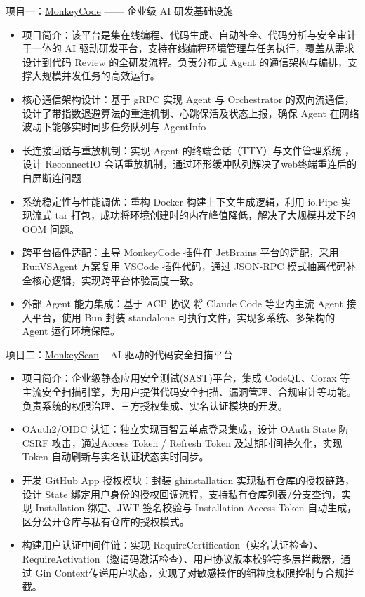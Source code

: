 \documentclass{resume}
\begin{document}
\begin{onehalfspacing}
项目一：\href{https://monkeycode-ai.com/}{MonkeyCode} —— 企业级 AI 研发基础设施
\begin{itemize}
  \item 项目简介：该平台是集在线编程、代码生成、自动补全、代码分析与安全审计于一体的 AI 驱动研发平台，支持在线编程环境管理与任务执行，覆盖从需求设计到代码 Review 的全研发流程。负责分布式 Agent 的通信架构与编排，支撑大规模并发任务的高效运行。
  \item 核心通信架构设计：基于 gRPC 实现 Agent 与 Orchestrator 的双向流通信，设计了带指数退避算法的重连机制、心跳保活及状态上报，确保 Agent 在网络波动下能够实时同步任务队列与 AgentInfo
  \item 长连接回话与重放机制：实现 Agent 的终端会话（TTY）与文件管理系统 ，设计 ReconnectIO 会话重放机制，通过环形缓冲队列解决了web终端重连后的白屏断连问题
  \item 系统稳定性与性能调优：重构 Docker 构建上下文生成逻辑，利用 io.Pipe 实现流式 tar 打包，成功将环境创建时的内存峰值降低，解决了大规模并发下的 OOM 问题。
  \item 跨平台插件适配：主导 MonkeyCode 插件在 JetBrains 平台的适配，采用 RunVSAgent 方案复用 VSCode 插件代码，通过 JSON-RPC 模式抽离代码补全核心逻辑，实现跨平台体验高度一致。
  \item 外部 Agent 能力集成：基于 ACP 协议 将 Claude Code 等业内主流 Agent 接入平台，使用 Bun 封装 standalone 可执行文件，实现多系统、多架构的 Agent 运行环境保障。
\end{itemize}
  

项目二：\href{https://scan.monkeycode-ai.com/}{MonkeyScan} -- AI 驱动的代码安全扫描平台
\begin{itemize}
  \item 项目简介：企业级静态应用安全测试(SAST)平台，集成 CodeQL、Corax 等主流安全扫描引擎，为用户提供代码安全扫描、漏洞管理、合规审计等功能。负责系统的权限治理、三方授权集成、实名认证模块的开发。
  \item OAuth2/OIDC 认证：独立实现百智云单点登录集成，设计 OAuth State 防CSRF 攻击，通过Access Token / Refresh Token 及过期时间持久化，实现 Token 自动刷新与实名认证状态实时同步。
  \item 开发 GitHub App 授权模块：封装 ghinstallation 实现私有仓库的授权链路，设计 State 绑定用户身份的授权回调流程，支持私有仓库列表/分支查询，实现 Installation 绑定、JWT 签名校验与 Installation Access Token 自动生成，区分公开仓库与私有仓库的授权模式。
  \item 构建用户认证中间件链：实现 RequireCertification（实名认证检查）、RequireActivation（邀请码激活检查）、用户协议版本校验等多层拦截器，通过 Gin Context传递用户状态，实现了对敏感操作的细粒度权限控制与合规拦截。
\end{itemize}


\end{onehalfspacing}
\end{document}
